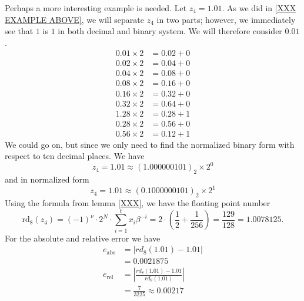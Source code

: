 \begin{exmp}
    Perhaps a more interesting example is needed. Let \(z_4 = 1.01\). As we did in \ref{XXX EXAMPLE ABOVE}, we will separate \(z_4\) in two parts; however, we immediately see that \(1\) is \(1\) in both decimal and binary system. We will therefore consider \(0.01\).
    \begin{align*}
        0.01 \times 2 &= 0.02 + 0 \\
        0.02 \times 2 &= 0.04 + 0 \\
        0.04 \times 2 &= 0.08 + 0 \\
        0.08 \times 2 &= 0.16 + 0 \\
        0.16 \times 2 &= 0.32 + 0 \\
        0.32 \times 2 &= 0.64 + 0 \\
        1.28 \times 2 &= 0.28 + 1 \\
        0.28 \times 2 &= 0.56 + 0 \\
        0.56 \times 2 &= 0.12 + 1
    \end{align*}
    We could go on, but since we only need to find the normalized binary form with respect to ten decimal places. We have
    \begin{equation*}
        z_4 = 1.01 \approx (1.000000101)_2 \times 2^0
    \end{equation*}
    and in normalized form
    \begin{equation*}
        z_4 = 1.01 \approx (0.1000000101)_2 \times 2^1
    \end{equation*}
    Using the formula from lemma \ref{XXX}, we have the floating point number
    \begin{equation*}
        \text{rd}_8(z_4) = (-1)^{\nu} \cdot 2^N \cdot \sum_{i=1}^{t}x_i \beta^{-i} = 2 \cdot \left(\frac{1}{2} + \frac{1}{256}\right) = \frac{129}{128} = 1.0078125 \text{.}
    \end{equation*}
    For the absolute and relative error we have
    \begin{align*}
        e_\text{abs} &= \left| {rd}_8(1.01) - 1.01 \right| \\
        &= 0.0021875 \\
        e_\text{rel} &= \left| \frac{{rd}_8(1.01) - 1.01}{{rd}_8(1.01)} \right| \\
        &= \frac{7}{3225} \approx 0.00217
    \end{align*}
\end{exmp}
%
